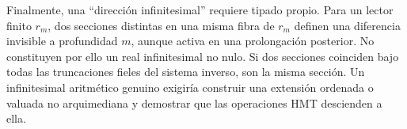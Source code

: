 Finalmente, una ``dirección infinitesimal'' requiere tipado propio. Para un
lector finito \(r_m\), dos secciones distintas en una misma fibra de \(r_m\)
definen una diferencia invisible a profundidad \(m\), aunque activa en una
prolongación posterior. No constituyen por ello un real infinitesimal no nulo.
Si dos secciones coinciden bajo todas las truncaciones fieles del sistema
inverso, son la misma sección. Un infinitesimal aritmético genuino exigiría
construir una extensión ordenada o valuada no arquimediana y demostrar que las
operaciones HMT descienden a ella.
